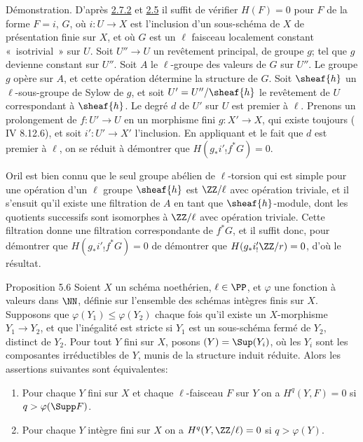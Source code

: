 \documentclass[10pt]{../fichiers-configuration-latex/smfart}
\begin{document}
Démonstration. D'après \hyperref[IX.cor2.7.2]{2.7.2} et \hyperref[IX.prop2.5]{2.5} il
suffit de vérifier $H(F)=0$
pour $F$ de la forme $F=i$, $G$, où $i:U\rightarrow X$ est l'inclusion
d'un sous-schéma de $X$ de présentation finie sur $X$, et où $G$ est
un $\ell$ faisceau localement constant « isotrivial »  sur
$U$. Soit $U''\rightarrow U$ un revêtement principal, de groupe $g$;
tel que $g$ devienne constant sur $U''$. Soit $A$ le $\ell$-groupe des
valeurs de $G$ sur $U''$. Le groupe $g$ opère sur $A$, et cette
opération détermine la structure de $G$. Soit $\sheaf{h}$ un
$\ell$-sous-groupe de Sylow de $g$, et soit $U'=U''/\sheaf{h}$ le
revêtement de $U$ correspondant à $\sheaf{h}$. Le degré $d$ de $U'$ sur
$U$ est premier à $\ell$. Prenons un prolongement de $f:U'\rightarrow
U$ en un morphisme fini $g:X'\rightarrow X$, qui existe toujours (\EGA
IV 8.12.6), et soit $i':U'\rightarrow X'$ l'inclusion. En appliquant
 et le fait que $d$ est premier à $\ell$, on se réduit
à démontrer
que $H(g_{\ast}i'_{!}f^{\ast} G)=0$.

Or\pageoriginale il est bien connu que le seul groupe abélien de
$\ell$-torsion qui est simple pour une opération d'un $\ell$ groupe
$\sheaf{h}$ est $\ZZ/\ell$ avec opération triviale, et
il s'ensuit qu'il existe une filtration de $A$ en tant que
$\sheaf{h}$-module, dont les quotients successifs sont isomorphes à
$\ZZ/\ell$ avec opération triviale. Cette
filtration donne une filtration correspondante de $f^{\ast} G$, et il
suffit donc, pour démontrer que $H(g_{\ast}i'_{!} f^{\ast} G)=0$ de
démontrer que $H(g_{\ast}i'_{!}\ZZ/r)=0$, d'où le
résultat.

\begin{enonce*}{Proposition 5.6}
Soient $X$ un schéma noethérien, $\ell \in \PP$, et
$\varphi$ une fonction à valeurs dans $\NN$,
définie sur l'ensemble des schémas intègres finis sur $X$. Supposons
que $\varphi(Y_1)\leq \varphi(Y_2)$ chaque fois qu'il existe un
$X$-morphisme $Y_1\rightarrow Y_2$, et que l'inégalité est stricte si
$Y_1$ est un sous-schéma fermé de $Y_2$, distinct de $Y_2$. Pour tout
$Y$ fini sur $X$, posons $(Y)=\Sup (Y_i)$, où les $Y_i$ sont les
composantes irréductibles de $Y$, munis de la structure induit
réduite. Alors les assertions suivantes sont équivalentes:
\begin{enumerate}
\renewcommand{\theenumi}{\roman{enumi}}
\renewcommand{\labelenumi}{(\theenumi)}
\item Pour chaque $Y$ fini sur $X$ et chaque $\ell$-faisceau $F$ sur
$Y$ on a $H^q(Y,F)=0$ si $q>\varphi(\Supp F)$.

\item Pour chaque $Y$ intègre fini sur $X$ on a
$H^q(Y,\ZZ/\ell)=0$ si $q>\varphi(Y)$.
\end{enumerate}
\end{enonce*}
\end{document}
